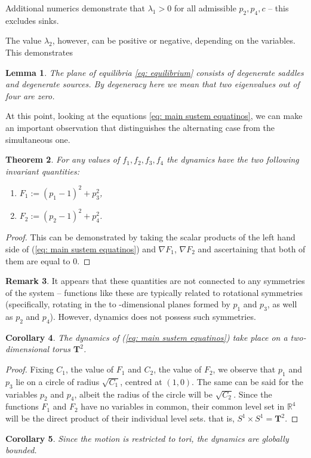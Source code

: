 \documentclass{article}
\newtheorem{theorem}{Theorem}[section]
\newtheorem{corollary}[theorem]{Corollary}
\newtheorem{lemma}[theorem]{Lemma}
\theoremstyle{definition}
\newtheorem{remark}[theorem]{Remark}
\numberwithin{equation}{section}
\begin{document}
Additional numerics demonstrate that $\lambda_1>0$ for all admissible $p_2,p_4,c$ -- this excludes sinks. 

The value $\lambda_2$, however, can be positive or negative, depending on the variables. This demonstrates
\begin{lemma}
    The plane of equilibria \eqref{eq: equilibrium} consists of  degenerate saddles and degenerate sources. By degeneracy here we mean that two eigenvalues out of four are zero.
\end{lemma}


At this point, looking at the equations \eqref{eq: main sustem equatinos}, we can make an important observation that distinguishes the alternating case from the simultaneous one.  

\begin{theorem}
For any values of $f_1,f_2,f_3, f_4$ the dynamics have the two following invariant quantities:
\begin{enumerate}
    \item $F_1 := (p_1-1)^2 + p_3^2$,
    \item $F_
    2:= (p_2-1)^2 + p_4^2$.
\end{enumerate}
\end{theorem}
\begin{proof}
    This can be  demonstrated by taking the scalar products of the left hand side of (\ref{eq: main sustem equatinos}) and $\nabla F_1$,  $\nabla F_2$ and ascertaining that both of them are equal to 0. 
\end{proof}
\begin{remark}
It appears that these quantities are not connected to any symmetries of the system -- functions like these are typically related to rotational symmetries (specifically, rotating in the to -dimensional planes formed by $p_1$ and $p_3$, as well as $p_2$ and $p_4$). However, dynamics does not possess such symmetries. 
\end{remark}
\begin{corollary}
\label{corollary: toric coordinates}
     The dynamics of (\ref{eq: main sustem equatinos}) take place on a two-dimensional torus $\mathbf{T}^2$. 
\end{corollary}
\begin{proof}
    Fixing $C_1$, the value of $F_1$ and $C_2$, the value of $F_2$, we observe that $p_1$ and $p_3$ lie on a circle of radius $\sqrt{C_1}$, centred at $(1,0)$. The same can be said for the variables $p_2$ and $p_4$, albeit the radius of the circle will be $\sqrt{C_2}$. Since the functions $F_1$ and $F_2$ have no variables in common, their common level set in  $\mathbb{R}^4$ will be the direct product of their individual level sets. that is, $S^1\times S^1 = \mathbf{T}^2$. 
\end{proof}
\begin{corollary}
    Since the motion is restricted to tori, the dynamics are globally bounded. 
\end{corollary}
\end{document}
